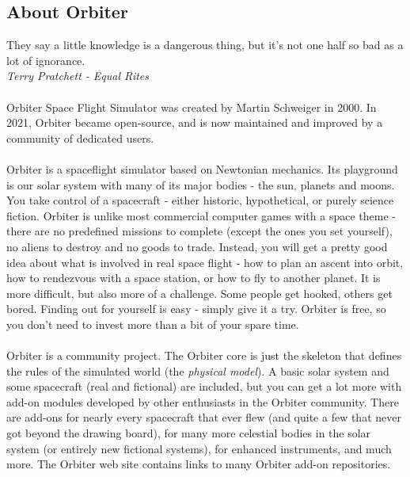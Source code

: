 \documentclass[Orbiter User Manual.tex]{subfiles}
\begin{document}
\subsection{About Orbiter}
They say a little knowledge is a dangerous thing, but it's not one half so bad as a lot of ignorance.\\
\textit{Terry Pratchett - Equal Rites}\\
\\
Orbiter Space Flight Simulator was created by Martin Schweiger in 2000. In 2021, Orbiter became open-source, and is now maintained and improved by a community of dedicated users.\\
\\
Orbiter is a spaceflight simulator based on Newtonian mechanics. Its playground is our solar system with many of its major bodies - the sun, planets and moons. You take control of a spacecraft - either historic, hypothetical, or purely science fiction. Orbiter is unlike most commercial computer games with a space theme - there are no predefined missions to complete (except the ones you set yourself), no aliens to destroy and no goods to trade. Instead, you will get a pretty good idea about what is involved in real space flight - how to plan an ascent into orbit, how to rendezvous with a space station, or how to fly to another planet. It is more difficult, but also more of a challenge. Some people get hooked, others get bored. Finding out for yourself is easy - simply give it a try. Orbiter is free, so you don't need to invest more than a bit of your spare time.\\
\\
Orbiter is a community project. The Orbiter core is just the skeleton that defines the rules of the simulated world (the \textit{physical model}). A basic solar system and some spacecraft (real and fictional) are included, but you can get a lot more with add-on modules developed by other enthusiasts in the Orbiter community. There are add-ons for nearly every spacecraft that ever flew (and quite a few that never got beyond the drawing board), for many more celestial bodies in the solar system (or entirely new fictional systems), for enhanced instruments, and much more. The Orbiter web site contains links to many Orbiter add-on repositories.
\end{document}
